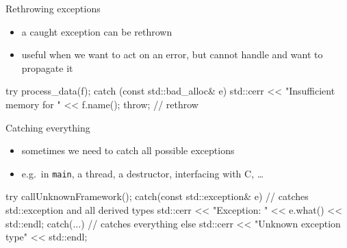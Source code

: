 \begin{frame}[fragile]
  \begin{block}{Rethrowing exceptions}
    \begin{itemize}
      \item a caught exception can be rethrown
      \item useful when we want to act on an error, but cannot handle and want to propagate it
    \end{itemize}
  \end{block}
  \begin{cppcode}
    try {
      process_data(f);
    } catch (const std::bad_alloc& e) {
      std::cerr << "Insufficient memory for " << f.name();
      throw; // rethrow
    }
  \end{cppcode}
\end{frame}

\begin{frame}[fragile]
  \begin{block}{Catching everything}
    \begin{itemize}
    \item sometimes we need to catch all possible exceptions
    \item e.g.\ in \texttt{main}, a thread, a destructor, interfacing with C, \ldots
    \end{itemize}
  \end{block}
  \begin{cppcode}

    try {
      callUnknownFramework();
    } catch(const std::exception& e) {
      // catches std::exception and all derived types
      std::cerr << "Exception: " << e.what() << std::endl;
    } catch(...) {
      // catches everything else
      std::cerr << "Unknown exception type" << std::endl;
    }
  \end{cppcode}
\end{frame}


